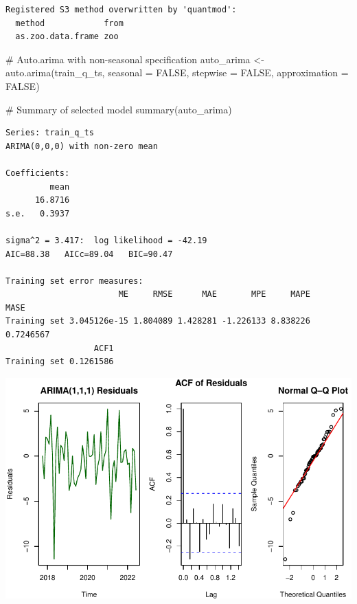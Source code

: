 \documentclass[
  11pt,
]{article}
\newenvironment{Shaded}{\begin{snugshade}}{\end{snugshade}}
\newcommand{\AttributeTok}[1]{\textcolor[rgb]{0.40,0.45,0.13}{#1}}
\newcommand{\CommentTok}[1]{\textcolor[rgb]{0.37,0.37,0.37}{#1}}
\newcommand{\ConstantTok}[1]{\textcolor[rgb]{0.56,0.35,0.01}{#1}}
\newcommand{\FunctionTok}[1]{\textcolor[rgb]{0.28,0.35,0.67}{#1}}
\newcommand{\NormalTok}[1]{\textcolor[rgb]{0.00,0.23,0.31}{#1}}
\newcommand{\OtherTok}[1]{\textcolor[rgb]{0.00,0.23,0.31}{#1}}
\begin{document}
\begin{verbatim}
Registered S3 method overwritten by 'quantmod':
  method            from
  as.zoo.data.frame zoo 
\end{verbatim}

\begin{Shaded}
\begin{Highlighting}[]
\CommentTok{\# Auto.arima with non{-}seasonal specification}
\NormalTok{auto\_arima }\OtherTok{\textless{}{-}} \FunctionTok{auto.arima}\NormalTok{(train\_q\_ts, }\AttributeTok{seasonal =} \ConstantTok{FALSE}\NormalTok{, }\AttributeTok{stepwise =} \ConstantTok{FALSE}\NormalTok{, }\AttributeTok{approximation =} \ConstantTok{FALSE}\NormalTok{)}

\CommentTok{\# Summary of selected model}
\FunctionTok{summary}\NormalTok{(auto\_arima)}
\end{Highlighting}
\end{Shaded}

\begin{verbatim}
Series: train_q_ts 
ARIMA(0,0,0) with non-zero mean 

Coefficients:
         mean
      16.8716
s.e.   0.3937

sigma^2 = 3.417:  log likelihood = -42.19
AIC=88.38   AICc=89.04   BIC=90.47

Training set error measures:
                       ME     RMSE      MAE       MPE     MAPE      MASE
Training set 3.045126e-15 1.804089 1.428281 -1.226133 8.838226 0.7246567
                  ACF1
Training set 0.1261586
\end{verbatim}

\includegraphics{project_files/figure-pdf/unnamed-chunk-48-1.pdf}
\end{document}

